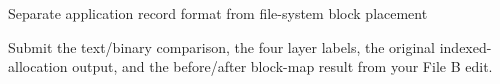 \begin{labproject}{Separate application record format from file-system block placement}
\begin{labdeliverable}
Submit the text/binary comparison, the four layer labels, the original indexed-allocation output, and the before/after block-map result from your File B edit.
\end{labdeliverable}
\end{labproject}
